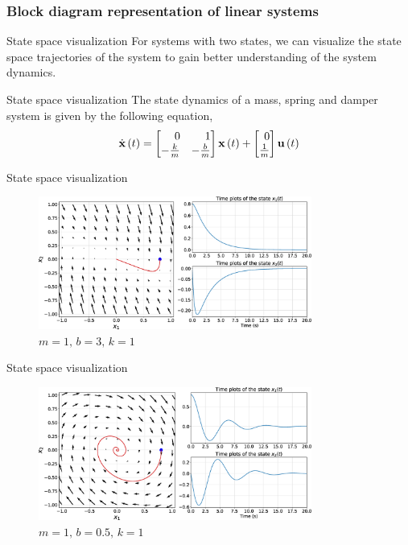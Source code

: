 \documentclass[aspectratio=169]{beamer}
\def\mf{\ensuremath\mathbf}
\def\lp{\ensuremath\left(}
\def\rp{\ensuremath\right)}
\def\bmx{\ensuremath\begin{bmatrix*}[r]}
\def\emx{\ensuremath\end{bmatrix*}}
\newcommand{\ct}[1]{\lp #1\rp}
\begin{document}
\begin{frame}[t]
    \frametitle{Block diagram representation of linear systems}
    
\end{frame}

\begin{frame}[t]{State space visualization}
For systems with two states, we can  visualize the state space trajectories of the system to gain better understanding of the system dynamics.

\end{frame}


\begin{frame}[t]{State space visualization}
The state dynamics of a mass, spring and damper system is given by the following equation,
\[ \dot{\mf{x}}\ct{t} = \bmx 0 & 1\\ -\frac{k}{m} & -\frac{b}{m}\emx \mf{x}\ct{t} + \bmx 0 \\ \frac{1}{m}\emx \mf{u}\ct{t} \]
\end{frame}

\begin{frame}[t]{State space visualization}
\begin{figure}
    \includegraphics[width=0.8\textwidth]{img/overdamped.eps}
    \captionsetup{labelformat=empty}
    \caption{\small $m=1, \, b=3, \, k=1$}
\end{figure}

\end{frame}

\begin{frame}[t]{State space visualization}
\begin{figure}
    \includegraphics[width=0.8\textwidth]{img/underdamped.eps}
    \captionsetup{labelformat=empty}
    \caption{\small $m=1, \, b=0.5, \, k=1$}
\end{figure}

\end{frame}
\end{document}

